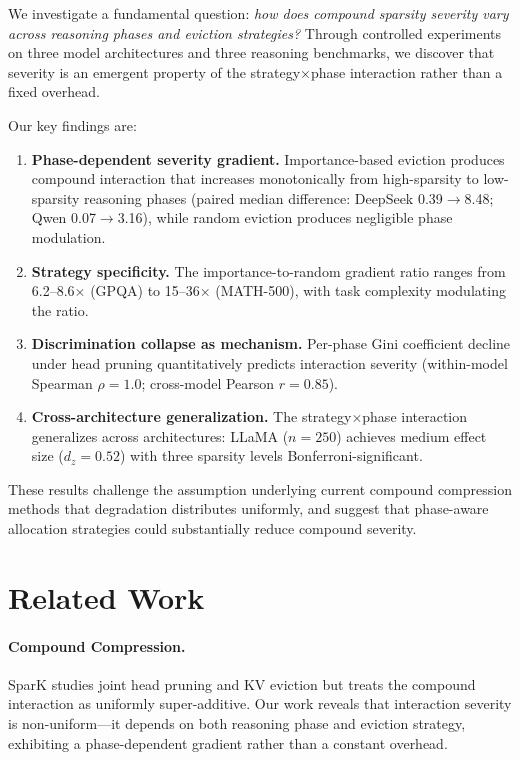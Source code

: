 \documentclass[11pt,a4paper]{article}
\begin{document}
We investigate a fundamental question: \emph{how does compound sparsity severity vary across reasoning phases and eviction strategies?} Through controlled experiments on three model architectures and three reasoning benchmarks, we discover that severity is an emergent property of the strategy$\times$phase interaction rather than a fixed overhead.

Our key findings are:
\begin{enumerate}
\item \textbf{Phase-dependent severity gradient.} Importance-based eviction produces compound interaction that increases monotonically from high-sparsity to low-sparsity reasoning phases (paired median difference: DeepSeek 0.39$\to$8.48; Qwen 0.07$\to$3.16), while random eviction produces negligible phase modulation.
\item \textbf{Strategy specificity.} The importance-to-random gradient ratio ranges from 6.2--8.6$\times$ (GPQA) to 15--36$\times$ (MATH-500), with task complexity modulating the ratio.
\item \textbf{Discrimination collapse as mechanism.} Per-phase Gini coefficient decline under head pruning quantitatively predicts interaction severity (within-model Spearman $\rho=1.0$; cross-model Pearson $r=0.85$).
\item \textbf{Cross-architecture generalization.} The strategy$\times$phase interaction generalizes across architectures: LLaMA ($n=250$) achieves medium effect size ($d_z=0.52$) with three sparsity levels Bonferroni-significant.
\end{enumerate}

These results challenge the assumption underlying current compound compression methods that degradation distributes uniformly, and suggest that phase-aware allocation strategies could substantially reduce compound severity.

\section{Related Work}

\paragraph{Compound Compression.} SparK \cite{spark2024} studies joint head pruning and KV eviction but treats the compound interaction as uniformly super-additive. Our work reveals that interaction severity is non-uniform---it depends on both reasoning phase and eviction strategy, exhibiting a phase-dependent gradient rather than a constant overhead.
\end{document}
